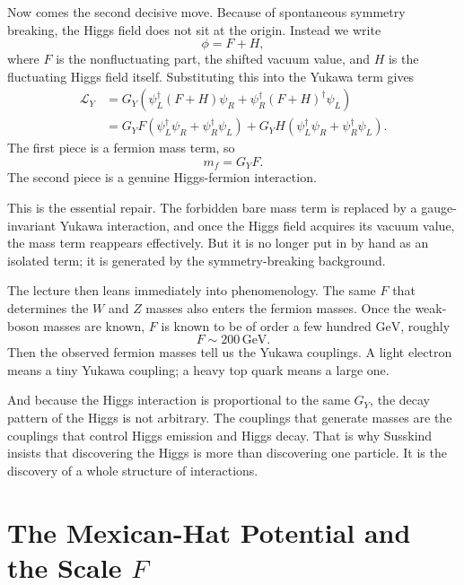 Now comes the second decisive move. Because of spontaneous symmetry breaking, the Higgs field does not sit at the origin. Instead we write
\begin{equation}
\phi = F + H,
\end{equation}
where \(F\) is the nonfluctuating part, the shifted vacuum value, and \(H\) is the fluctuating Higgs field itself. Substituting this into the Yukawa term gives
\begin{align}
\mathcal{L}_Y
&=
G_Y\left(\psi_L^\dagger (F+H)\psi_R+\psi_R^\dagger (F+H)^\dagger \psi_L\right) \\
&=
G_YF\left(\psi_L^\dagger\psi_R+\psi_R^\dagger\psi_L\right)
+
G_YH\left(\psi_L^\dagger\psi_R+\psi_R^\dagger\psi_L\right).
\end{align}
The first piece is a fermion mass term, so
\begin{equation}
m_f = G_Y F.
\end{equation}
The second piece is a genuine Higgs-fermion interaction.

This is the essential repair. The forbidden bare mass term is replaced by a gauge-invariant Yukawa interaction, and once the Higgs field acquires its vacuum value, the mass term reappears effectively. But it is no longer put in by hand as an isolated term; it is generated by the symmetry-breaking background.

The lecture then leans immediately into phenomenology. The same \(F\) that determines the \(W\) and \(Z\) masses also enters the fermion masses. Once the weak-boson masses are known, \(F\) is known to be of order a few hundred \(\mathrm{GeV}\), roughly
\begin{equation}
F \sim 200\,\mathrm{GeV}.
\end{equation}
Then the observed fermion masses tell us the Yukawa couplings. A light electron means a tiny Yukawa coupling; a heavy top quark means a large one.

And because the Higgs interaction is proportional to the same \(G_Y\), the decay pattern of the Higgs is not arbitrary. The couplings that generate masses are the couplings that control Higgs emission and Higgs decay. That is why Susskind insists that discovering the Higgs is more than discovering one particle. It is the discovery of a whole structure of interactions.

\section{The Mexican-Hat Potential and the Scale \(F\)}

